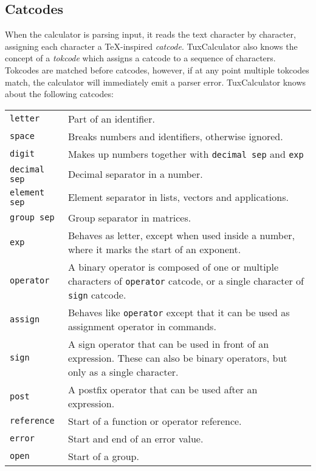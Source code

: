 \documentclass[10pt]{article}
\begin{document}
    \subsection{Catcodes}\label{subsec:catcodes}
    When the calculator is parsing input, it reads the text character by character, assigning each character a \TeX-inspired \textit{catcode}.
    TuxCalculator also knows the concept of a \textit{tokcode} which assigns a catcode to a sequence of characters.
    Tokcodes are matched before catcodes, however, if at any point multiple tokcodes match, the calculator will immediately emit a parser error.
    TuxCalculator knows about the following catcodes:
    \begin{longtable}{p{}p{}}
        \verb|letter|       & Part of an identifier. \\
        \verb|space|        & Breaks numbers and identifiers, otherwise ignored. \\
        \verb|digit|        & Makes up numbers together with \verb|decimal sep| and \verb|exp| \\
        \verb|decimal sep|  & Decimal separator in a number. \\
        \verb|element sep|  & Element separator in lists, vectors and applications. \\
        \verb|group sep|    & Group separator in matrices. \\
        \verb|exp|          & Behaves as letter, except when used inside a number, where it marks the start of an exponent. \\
        \verb|operator|     & A binary operator is composed of one or multiple characters of \verb|operator| catcode, or a single character of \verb|sign| catcode. \\
        \verb|assign|       & Behaves like \verb|operator| except that it can be used as assignment operator in commands. \\
        \verb|sign|         & A sign operator that can be used in front of an expression. These can also be binary operators, but only as a single character. \\
        \verb|post|         & A postfix operator that can be used after an expression. \\
        \verb|reference|    & Start of a function or operator reference. \\
        \verb|error|        & Start and end of an error value. \\
        \verb|open|         & Start of a group. \\

\end{longtable}
\end{document}
